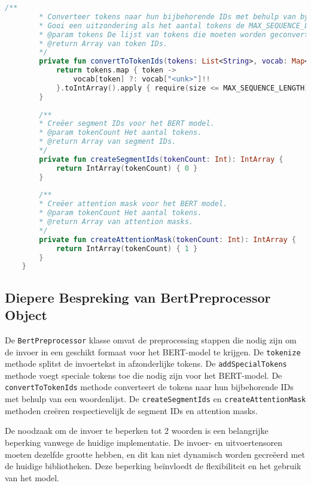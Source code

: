 \begin{lstlisting}[language=Kotlin, caption={Implementatie van BertPreprocessor object}]
        /**
        * Converteer tokens naar hun bijbehorende IDs met behulp van byteEncoder.
        * Gooi een uitzondering als het aantal tokens de MAX_SEQUENCE_LENGTH overschrijdt.
        * @param tokens De lijst van tokens die moeten worden geconverteerd.
        * @return Array van token IDs.
        */
        private fun convertToTokenIds(tokens: List<String>, vocab: Map<String, Int>): IntArray {
            return tokens.map { token ->
                vocab[token] ?: vocab["<unk>"]!!
            }.toIntArray().apply { require(size <= MAX_SEQUENCE_LENGTH) }
        }
        
        /**
        * Creëer segment IDs voor het BERT model.
        * @param tokenCount Het aantal tokens.
        * @return Array van segment IDs.
        */
        private fun createSegmentIds(tokenCount: Int): IntArray {
            return IntArray(tokenCount) { 0 }
        }
        
        /**
        * Creëer attention mask voor het BERT model.
        * @param tokenCount Het aantal tokens.
        * @return Array van attention masks.
        */
        private fun createAttentionMask(tokenCount: Int): IntArray {
            return IntArray(tokenCount) { 1 }
        }
    }
\end{lstlisting}

\subsection{Diepere Bespreking van BertPreprocessor Object}

De \texttt{BertPreprocessor} klasse omvat de preprocessing stappen die nodig zijn om de invoer in een geschikt formaat voor het BERT-model te krijgen. De \texttt{tokenize} methode splitst de invoertekst in afzonderlijke tokens. De \texttt{addSpecialTokens} methode voegt speciale tokens toe die nodig zijn voor het BERT-model. De \texttt{convertToTokenIds} methode converteert de tokens naar hun bijbehorende IDs met behulp van een woordenlijst. De \texttt{createSegmentIds} en \texttt{createAttentionMask} methoden creëren respectievelijk de segment IDs en attention masks.

De noodzaak om de invoer te beperken tot 2 woorden is een belangrijke beperking vanwege de huidige implementatie. De invoer- en uitvoertensoren moeten dezelfde grootte hebben, en dit kan niet dynamisch worden gecreëerd met de huidige bibliotheken. Deze beperking beïnvloedt de flexibiliteit en het gebruik van het model.

